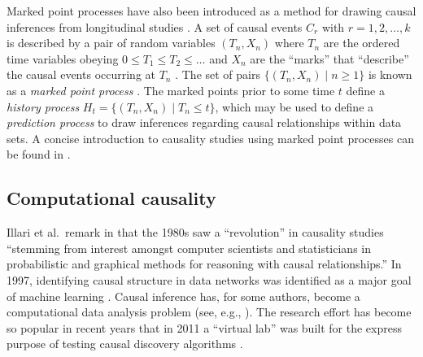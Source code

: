 Marked point processes have also been introduced as a method for drawing causal inferences from longitudinal studies \cite{Arjas1993,Arjas2004}.  A set of causal events $C_r$ with $r=1,2,\ldots,k$ is described by a pair of random variables $(T_n,X_n)$ where $T_n$ are the ordered time variables obeying $0\le T_1\le T_2 \le\ldots$ and $X_n$ are the ``marks'' that ``describe'' the causal events occurring at $T_n$ \cite{Eerola2012}.  The set of pairs $\{(T_n,X_n)\;|\;n\ge 1\}$ is known as a {\em marked point process } \cite{Eerola2012}.  The marked points prior to some time $t$ define a {\em history process } $H_t = \{(T_n,X_n)\;|\;T_n\le t\}$, which may be used to define a {\em prediction process} to draw inferences regarding causal relationships within data sets.  A concise introduction to causality studies using marked point processes can be found in \cite{Eerola2012}.

\subsection{Computational causality}
Illari et al.\ remark in \cite{Illari2011b} that the 1980s saw a ``revolution'' in causality studies ``stemming from interest amongst computer scientists and statisticians in probabilistic and graphical methods for reasoning with causal relationships.''  In 1997, identifying causal structure in data networks was identified as a major goal of machine learning \cite{Ditterrich1997}.  Causal inference has, for some authors, become a computational data analysis problem (see, e.g., \cite{Pearl2000}).  The research effort has become so popular in recent years that in 2011 a ``virtual lab'' was built for the express purpose of testing causal discovery algorithms \cite{Guyon2011}.


